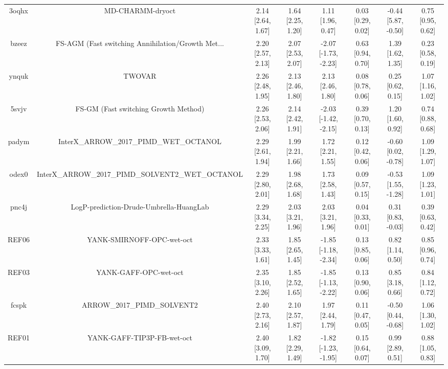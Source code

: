 \documentclass{article}
\begin{document}
\begin{center}
\begin{longtable}{|cccccccc|}
 3oqhx &                                   MD-CHARMM-dryoct &  2.14 [2.64, 1.67] &  1.64 [2.25, 1.20] &     1.11 [1.96, 0.47] &  0.03 [0.29, 0.02] &   -0.44 [5.87, -0.50] &     0.75 [0.95, 0.62] \\
 bzeez &  FS-AGM (Fast switching Annihilation/Growth Met... &  2.20 [2.57, 2.13] &  2.07 [2.53, 2.07] &  -2.07 [-1.73, -2.23] &  0.63 [0.94, 0.70] &     1.39 [1.62, 1.35] &     0.23 [0.58, 0.19] \\
 ynquk &                                             TWOVAR &  2.26 [2.48, 1.95] &  2.13 [2.46, 1.80] &     2.13 [2.46, 1.80] &  0.08 [0.78, 0.06] &     0.25 [0.62, 0.15] &     1.07 [1.16, 1.02] \\
 5svjv &               FS-GM (Fast switching Growth Method) &  2.26 [2.53, 2.06] &  2.14 [2.42, 1.91] &  -2.03 [-1.42, -2.15] &  0.39 [0.70, 0.13] &     1.20 [1.60, 0.92] &     0.74 [0.88, 0.68] \\
 padym &            InterX\_ARROW\_2017\_PIMD\_WET\_OCTANOL &  2.29 [2.61, 1.94] &  1.99 [2.21, 1.66] &     1.72 [2.21, 1.55] &  0.12 [0.42, 0.06] &   -0.60 [0.02, -0.78] &     1.09 [1.29, 1.07] \\
 odex0 &  InterX\_ARROW\_2017\_PIMD\_SOLVENT2\_WET\_OCTANOL &  2.29 [2.80, 2.01] &  1.98 [2.68, 1.68] &     1.73 [2.58, 1.43] &  0.09 [0.57, 0.15] &   -0.53 [1.55, -1.28] &     1.09 [1.23, 1.01] \\
 pnc4j &            LogP-prediction-Drude-Umbrella-HuangLab &  2.29 [3.34, 2.25] &  2.03 [3.21, 1.96] &     2.03 [3.21, 1.96] &  0.04 [0.33, 0.01] &    0.31 [0.83, -0.03] &     0.39 [0.63, 0.42] \\
 REF06 &                          YANK-SMIRNOFF-OPC-wet-oct &  2.33 [3.33, 1.61] &  1.85 [2.65, 1.45] &  -1.85 [-1.18, -2.34] &  0.13 [0.85, 0.06] &     0.82 [1.14, 0.50] &     0.85 [0.96, 0.74] \\
 REF03 &                              YANK-GAFF-OPC-wet-oct &  2.35 [3.10, 2.26] &  1.85 [2.52, 1.65] &  -1.85 [-1.13, -2.22] &  0.13 [0.90, 0.06] &     0.85 [3.18, 0.66] &     0.84 [1.12, 0.72] \\
 fcspk &                        ARROW\_2017\_PIMD\_SOLVENT2 &  2.40 [2.73, 2.16] &  2.10 [2.57, 1.87] &     1.97 [2.44, 1.79] &  0.11 [0.47, 0.05] &   -0.50 [0.44, -0.68] &     1.06 [1.30, 1.02] \\
 REF01 &                         YANK-GAFF-TIP3P-FB-wet-oct &  2.40 [3.09, 1.70] &  1.82 [2.29, 1.49] &  -1.82 [-1.23, -1.95] &  0.15 [0.64, 0.07] &     0.99 [2.89, 0.51] &     0.88 [1.05, 0.83] \\

\end{longtable}
\end{center}
\end{document}
